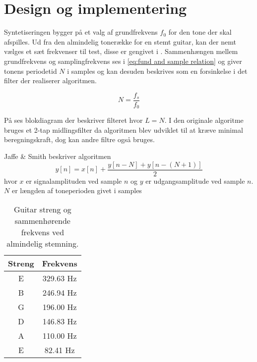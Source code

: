 \section{Design og implementering}

Syntetiseringen bygger på et valg af grundfrekvens \(f_0\) for den tone der skal afspilles.
Ud fra den almindelig tonerække for en stemt guitar\cite{GuitarTunings}, kan der nemt vælges et sæt frekvenser til test, disse er gengivet i .
Sammenhængen mellem grundfrekvens og samplingfrekvens ses i \ref{eq:fund and sample relation} og giver tonens periodetid \(N\) i samples og kan desuden beskrives som en forsinkelse i det filter der realiserer algoritmen.

\begin{equation}\label{eq:fund and sample relation}
  N = \frac{f_s}{f_0}
\end{equation}

På  ses blokdiagram der beskriver filteret hvor \(L = N\). I den originale algoritme bruges et 2-tap midlingsfilter da algoritmen blev udviklet til at kræve minimal beregningskraft\cite{Karplus1983}, dog kan andre filtre også bruges.


Jaffe \& Smith beskriver algoritmen
\begin{equation}
  y[n] = x[n] + \frac{y[n - N] + y\left[n -(N + 1)\right]}{2}
\end{equation}
hvor \(x\) er signalamplituden ved sample \(n\) og \(y\) er udgangsamplitude ved sample \(n\).
\(N\) er længden af toneperioden givet i samples \cite{Jaffe1983}

\begin{table}[]
  \centering
  \caption{Guitar streng og sammenhørende frekvens ved almindelig stemning\cite{GuitarTunings}.}
  \label{tab:guitar tunings}
  \begin{tabular}{cc}
    \toprule
    Streng & Frekvens  \\ \midrule
    E      & 329.63 Hz \\
    B      & 246.94 Hz \\
    G      & 196.00 Hz \\
    D      & 146.83 Hz \\
    A      & 110.00 Hz \\
    E      & 82.41 Hz  \\ \bottomrule
  \end{tabular}
\end{table}

